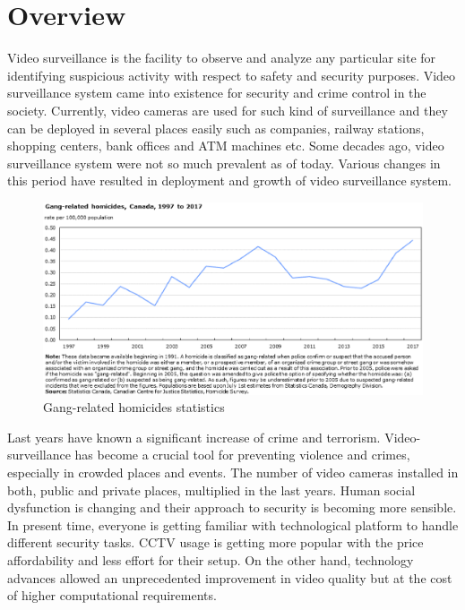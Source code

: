 \documentclass{fisatprojectfinal}
\begin{document}
\section{Overview}
\par Video surveillance is the facility to observe and analyze any particular site for identifying suspicious activity with respect to safety and security purposes. Video surveillance system came into existence for security and crime control in the society. Currently, video cameras are used for such kind of surveillance and they can be deployed in several places easily such as companies, railway stations, shopping centers, bank offices and ATM machines etc. Some decades ago, video surveillance system were not so much prevalent as of today. Various changes in this period have resulted in deployment and growth of video surveillance system. 
\begin{figure}[h!]
\begin{center}
\includegraphics[scale=.6]{img_homiciderate.eps}
\caption{Gang-related homicides statistics}
\end{center}
\end{figure}
Last years have known a significant increase of crime and terrorism. Video-surveillance has become a crucial tool for preventing violence and crimes, especially in crowded places and events. The number of video cameras installed in both, public and private places, multiplied in the last years. Human social dysfunction is changing and their approach to security is becoming more sensible. In present time, everyone is getting familiar with technological platform to handle different security tasks. CCTV usage is getting more popular with the price affordability and less effort for their setup. On the other hand, technology advances allowed an unprecedented improvement in video quality but at the cost of higher computational requirements.
\end{document}
